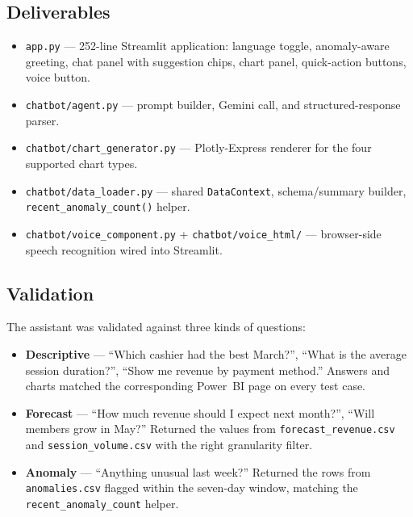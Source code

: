 \subsection{Deliverables}

\begin{itemize}[noitemsep]
  \item \texttt{app.py} --- 252-line Streamlit application: language
        toggle, anomaly-aware greeting, chat panel with suggestion
        chips, chart panel, quick-action buttons, voice button.
  \item \texttt{chatbot/agent.py} --- prompt builder, Gemini call, and
        structured-response parser.
  \item \texttt{chatbot/chart\_generator.py} --- Plotly-Express
        renderer for the four supported chart types.
  \item \texttt{chatbot/data\_loader.py} --- shared
        \texttt{DataContext}, schema/summary builder,
        \texttt{recent\_anomaly\_count()} helper.
  \item \texttt{chatbot/voice\_component.py} +
        \texttt{chatbot/voice\_html/} --- browser-side speech
        recognition wired into Streamlit.
\end{itemize}

\subsection{Validation}

The assistant was validated against three kinds of questions:

\begin{itemize}
  \item \textbf{Descriptive} --- ``Which cashier had the best March?'',
        ``What is the average session duration?'', ``Show me revenue by
        payment method.'' Answers and charts matched the corresponding
        Power~BI page on every test case.
  \item \textbf{Forecast} --- ``How much revenue should I expect next
        month?'', ``Will members grow in May?'' Returned the values
        from \texttt{forecast\_revenue.csv} and
        \texttt{session\_volume.csv} with the right granularity filter.
  \item \textbf{Anomaly} --- ``Anything unusual last week?'' Returned
        the rows from \texttt{anomalies.csv} flagged within the
        seven-day window, matching the \texttt{recent\_anomaly\_count}
        helper.
\end{itemize}

